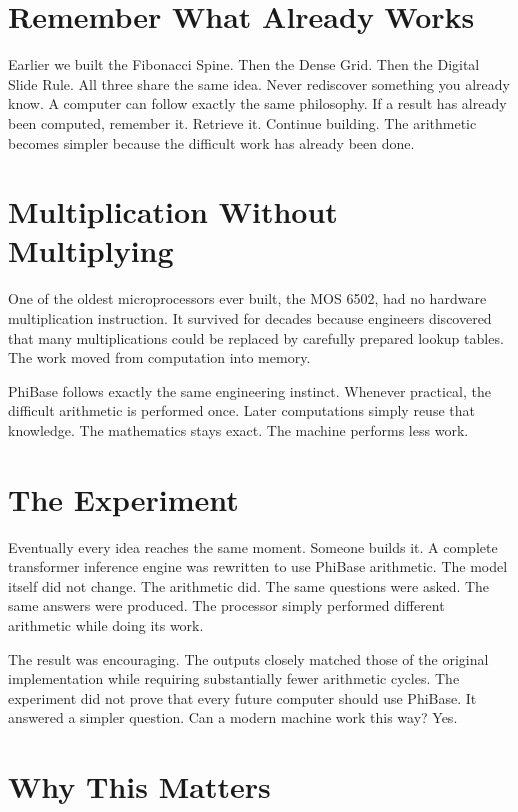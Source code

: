 \section*{Remember What Already Works}

Earlier we built the Fibonacci Spine. Then the Dense Grid. Then the Digital Slide Rule. All three share the same idea. Never rediscover something you already know. A computer can follow exactly the same philosophy. If a result has already been computed, remember it. Retrieve it. Continue building. The arithmetic becomes simpler because the difficult work has already been done.

\section*{Multiplication Without Multiplying}

One of the oldest microprocessors ever built, the MOS 6502, had no hardware multiplication instruction. It survived for decades because engineers discovered that many multiplications could be replaced by carefully prepared lookup tables. The work moved from computation into memory.

PhiBase follows exactly the same engineering instinct. Whenever practical, the difficult arithmetic is performed once. Later computations simply reuse that knowledge. The mathematics stays exact. The machine performs less work.

\section*{The Experiment}

Eventually every idea reaches the same moment. Someone builds it. A complete transformer inference engine was rewritten to use PhiBase arithmetic. The model itself did not change. The arithmetic did. The same questions were asked. The same answers were produced. The processor simply performed different arithmetic while doing its work.

The result was encouraging. The outputs closely matched those of the original implementation while requiring substantially fewer arithmetic cycles. The experiment did not prove that every future computer should use PhiBase. It answered a simpler question. Can a modern machine work this way? Yes.

\section*{Why This Matters}

